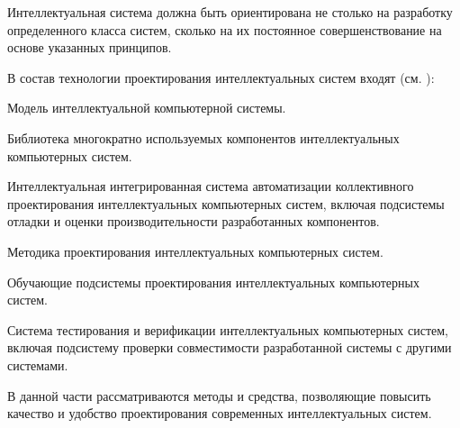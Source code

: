 \begin{partbacktext}
Интеллектуальная система должна быть ориентирована не столько на разработку определенного класса систем, сколько на их постоянное совершенствование на основе указанных принципов.

В состав технологии проектирования интеллектуальных систем входят (см. ):
\begin{textitemize}
	\item{Модель интеллектуальной компьютерной системы.}
	\item{Библиотека многократно используемых компонентов интеллектуальных компьютерных систем.}
	\item{Интеллектуальная интегрированная система автоматизации коллективного проектирования интеллектуальных компьютерных систем, включая подсистемы отладки и оценки производительности разработанных компонентов.}
	\item{Методика проектирования интеллектуальных компьютерных систем.}
	\item{Обучающие подсистемы проектирования интеллектуальных компьютерных систем.}
	\item{Система тестирования и верификации интеллектуальных компьютерных систем, включая подсистему проверки совместимости разработанной системы с другими системами.}
\end{textitemize}

В данной части рассматриваются методы и средства, позволяющие повысить качество и удобство проектирования современных интеллектуальных систем.
\end{partbacktext}




